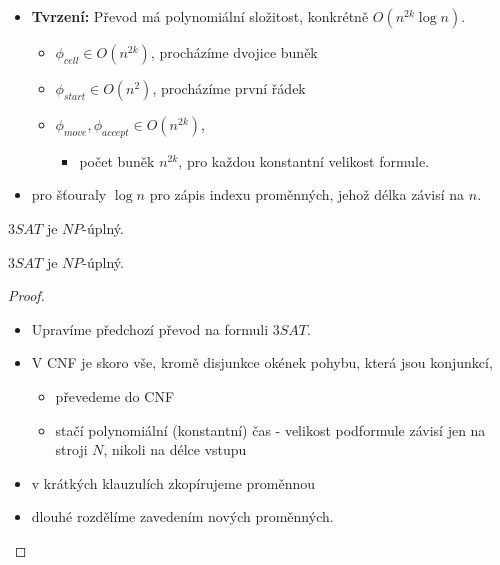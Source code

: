     \begin{frame}{}
    \begin{proofe}
    \begin{itemize}[<+->]
    \item {\bf Tvrzení:} Převod má polynomiální složitost, konkrétně $O(n^{2k}\log n)$.
    \begin{itemize}
        \item $\phi_{cell}\in O(n^{2k})$, procházíme dvojice buněk
        \item $\phi_{start}\in O(n^{2})$, procházíme první řádek
        \item $\phi_{move},\phi_{accept}\in O(n^{2k})$, 
    \begin{itemize}
    \item počet buněk $n^{2k}$, pro každou konstantní velikost formule.
    \end{itemize}
        
    \end{itemize}
    \item pro šťouraly $\log n$ pro zápis indexu proměnných, jehož délka závisí na $n$.
    \end{itemize}
    \end{proofe}
    \end{frame}
    
    
    \begin{frame}{$3SAT$ je $NP$-úplný.}
    
    \begin{theorem}
    $3SAT$ je $NP$-úplný.
    \end{theorem}
    \pause
    \begin{proof}
        \begin{itemize}[<+->]
            \item Upravíme předchozí převod na formuli $3SAT$.
            \item V CNF je skoro vše, kromě disjunkce okének pohybu, která jsou konjunkcí,
            \begin{itemize}
                \item převedeme do CNF
                \item stačí polynomiální (konstantní) čas - velikost podformule závisí jen na stroji $N$, nikoli na délce vstupu
            \end{itemize}
            \item v krátkých klauzulích zkopírujeme proměnnou
            \item dlouhé rozdělíme zavedením nových proměnných.
        \end{itemize}
    \end{proof}
    
    \end{frame}
    

